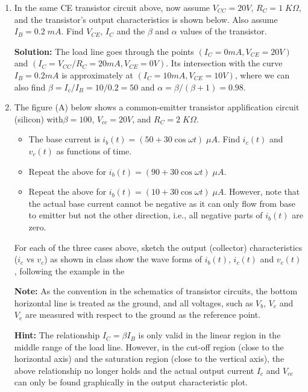 \begin{enumerate}
\item In the same CE transistor circuit above, now assume $V_{CC}=20V$,
  $R_C=1\;K\Omega$, and the transistor's output characteristics is shown
  below. Also assume $I_B=0.2\;mA$. Find $V_{CE}$, $I_C$ and the $\beta$
  and $\alpha$ values of the transistor.


{\bf Solution:} The load line goes through the points
$(I_C=0mA, V_{CE}=20V)$ and $(I_C=V_{CC}/R_C=20 mA, V_{CE}=0V)$.
Its intersection with the curve $I_B=0.2mA$ is approximately at
$(I_C=10mA, V_{CE}=10V)$, where we can also find $\beta=I_c/I_B=10/0.2=50$
and $\alpha=\beta/(\beta+1)=0.98$.

\item The figure (A) below shows a common-emitter transistor 
applification circuit (silicon) with$\beta=100$, $V_{cc}=20V$, 
and $R_C=2\;K\Omega$. 
\begin{itemize}
\item The base current is $i_b(t)=(50+30 \cos \omega t)\;\mu A$.
Find $i_c(t)$ and $v_c(t)$ as functions of time.
\item Repeat the above for $i_b(t)=(90+30 \cos \omega t)\;\mu A$.
\item Repeat the above for $i_b(t)=(10+30 \cos \omega t)\;\mu A$.
  However, note that the actual base current cannot be negative as 
  it can only flow from base to emitter but not the other direction,
  i.e., all negative parts of $i_b(t)$ are zero.
\end{itemize}
For each of the three cases above, sketch the output (collector) 
characteristics ($i_c$ vs $v_c$) as shown in class show the wave
forms of $i_b(t)$, $i_c(t)$ and $v_c(t)$, following the example
in the 

{\bf Note:} As the convention in the schematics of transistor circuits,
the bottom horizontal line is treated as the ground, and all voltages,
such as $V_b$, $V_c$ and $V_e$ are measured with respect to the 
ground as the reference point.

{\bf Hint:} The relationship $I_C=\beta I_B$ is only valid in the
linear region in the middle range of the load line. However, in 
the cut-off region (close to the horizontal axis) and the saturation
region (close to the vertical axis), the above relationship no
longer holds and the actual output current $I_c$ and $V_{ce}$ can
only be found graphically in the output characteristic plot.


\end{enumerate}
